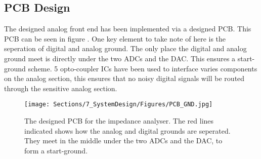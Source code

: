 \subsection{PCB Design} \label{subsec:PCBDesign}

The designed analog front end has been implemented via a designed PCB. This PCB can be seen in figure . One key element to take note of here is the seperation of digital and analog ground. The only place the digital and analog ground meet is directly under the two ADCs and the DAC. This ensures a start-ground scheme. 5 opto-coupler ICs have been used to interface varies components on the analog section, this ensures that no noisy digital signals will be routed through the sensitive analog section. 

\begin{figure}[H]
    \centering
    \texttt{[image: Sections/7\_SystemDesign/Figures/PCB\_GND.jpg]}
    \caption{The designed PCB for the impedance analyser. The red lines indicated shows how the analog and digital grounds are seperated. They meet in the middle under the two ADCs and the DAC, to form a start-ground.}
    \label{fig_PCB}
\end{figure}